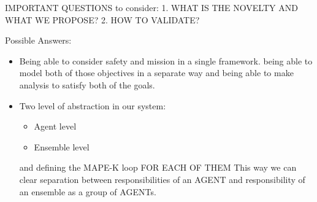 \documentclass[journal]{IEEEtran}
\theoremstyle{definition}
\begin{document}








IMPORTANT QUESTIONS to consider:
1. WHAT IS THE NOVELTY AND WHAT WE PROPOSE?
2. HOW TO VALIDATE?

Possible Answers:
\begin{itemize}


\item Being able to consider safety and mission in a single framework. being able to model both of those objectives in a separate way and being able to make analysis to satisfy both of the goals.
\item Two level of abstraction in our system:
\begin{itemize}
    \item Agent level
    \item Ensemble level
\end{itemize}
    and defining the MAPE-K loop FOR EACH OF THEM
    This way we can clear separation between responsibilities of an AGENT and responsibility of an ensemble as a group of AGENTs.

\end{itemize}


\end{document}
